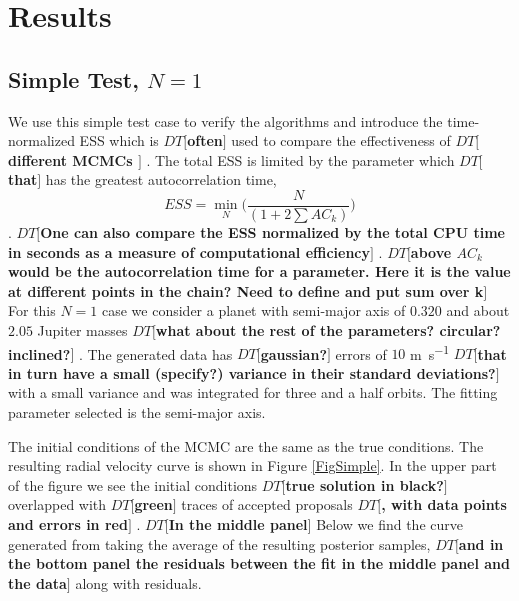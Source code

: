 \documentclass{aa}
\def\memodt#1{\color{green}$DT[${\bf #1}$]$ \color{black}}
\begin{document}
\section{Results}\label{results}
\subsection{Simple Test, $N=1$}
We use this simple test case to verify the algorithms and introduce the time-normalized ESS which is \memodt{often} used to compare the effectiveness of \memodt{different MCMCs \citep[e.g.,][]{Girolami2011, 1504.01418, Meyer2016, Lan2015}}.
The total ESS is limited by the parameter which \memodt{that} has the greatest autocorrelation time, $$ESS = \min_N\bigg( \frac{N}{(1+2\sum AC_k)}\bigg)$$. \memodt{One can also compare the ESS normalized by the total CPU time in seconds as a measure of computational efficiency}. 
\memodt{above $AC_k$ would be the autocorrelation time for a parameter. Here it is the value at different points in the chain? Need to define and put sum over k}
For this $N=1$ case we consider a planet with semi-major axis of $0.320$ and about $2.05$ Jupiter masses \memodt{what about the rest of the parameters? circular? inclined?}.%
The generated data has \memodt{gaussian?} errors of $10$ \si{\metre\per\second} \memodt{that in turn have a small (specify?) variance in their standard deviations?}with a small variance and was integrated for three and a half orbits.
The fitting parameter selected is the semi-major axis.

The initial conditions of the MCMC are the same as the true conditions. 
The resulting radial velocity curve is shown in Figure \ref{FigSimple}. 
In the upper part of the figure we see the initial conditions \memodt{true solution in black?} overlapped with \memodt{green} traces of accepted proposals \memodt{, with data points and errors in red}. 
\memodt{In the middle panel}Below we find the curve generated from taking the average of the resulting posterior samples, \memodt{and in the bottom panel the residuals between the fit in the middle panel and the data}along with residuals.
\end{document}
